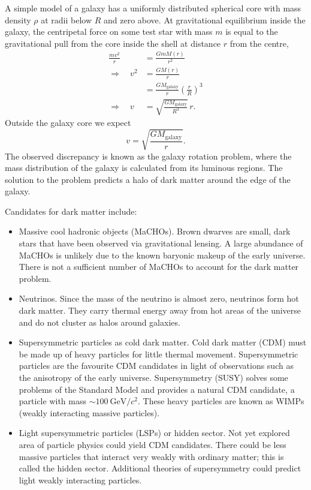 A simple model of a galaxy has a uniformly distributed spherical core with mass density $\rho$ at radii below $R$ and zero above. At gravitational equilibrium inside the galaxy, the centripetal force on some test star with mass $m$ is equal to the gravitational pull from the core inside the shell at distance $r$ from the centre,
\begin{align}
\frac{mv^2}{r} &= \frac{GmM(r)}{r^2} \\
\Rightarrow \quad v^2 &= \frac{GM(r)}{r} \\
&= \frac{GM_\text{galaxy}}{r}\left(\frac{r}{R}\right)^3\\
\Rightarrow \quad v &= \sqrt{\frac{GM_\text{galaxy}}{R^3}} \, r.
\end{align}
Outside the galaxy core we expect
\begin{equation}
v = \sqrt{\frac{GM_\text{galaxy}}{r}}.
\end{equation}
The observed discrepancy is known as the galaxy rotation problem, where the mass distribution of the galaxy is calculated from its luminous regions. The solution to the problem predicts a halo of dark matter around the edge of the galaxy.

Candidates for dark matter include:
\begin{itemize}
\item Massive cool hadronic objects (MaCHOs). Brown dwarves are small, dark stars that have been observed via gravitational lensing. A large abundance of MaCHOs is unlikely due to the known baryonic makeup of the early universe. There is not a sufficient number of MaCHOs to account for the dark matter problem.
\item Neutrinos. Since the mass of the neutrino is almost zero, neutrinos form hot dark matter. They carry thermal energy away from hot areas of the universe and do not cluster as halos around galaxies.
\item Supersymmetric particles as cold dark matter. Cold dark matter (CDM) must be made up of heavy particles for little thermal movement. Supersymmetric particles are the favourite CDM candidates in light of observations such as the anisotropy of the early universe. Supersymmetry (SUSY) solves some problems of the Standard Model and provides a natural CDM candidate, a particle with mass $\sim \SI{100}{\giga\electronvolt/c^2}$. These heavy particles are known as WIMPs (weakly interacting massive particles).
\item Light supersymmetric particles (LSPs) or hidden sector. Not yet explored area of particle physics could yield CDM candidates. There could be less massive particles that interact very weakly with ordinary matter; this is called the hidden sector. Additional theories of supersymmetry could predict light weakly interacting particles.
\end{itemize}

